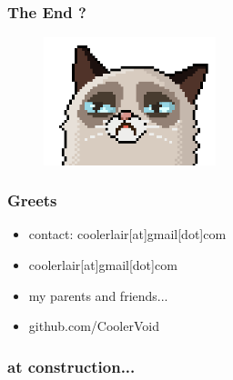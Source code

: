 \documentclass[serif,mathserif]{beamer}
\begin{document}
\begin{frame}
  \frametitle{The End ?}
  \begin{figure}[]    
    \centering
    \includegraphics[width=5cm]{images/codecat00.png} 
  \end{figure}
\end{frame}




\begin{frame}
  \frametitle{Greets}
  \begin{itemize}
  \item contact: coolerlair[at]gmail[dot]com 
  \item coolerlair[at]gmail[dot]com
  \item my parents and friends...
  \item github.com/CoolerVoid
  \end{itemize}
\end{frame}

\begin{frame}
  \frametitle{at construction...}
\end{frame}
\end{document}
